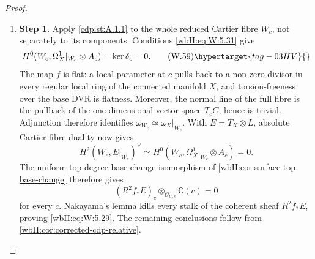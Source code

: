 \begin{proof}
\begin{enumerate}[label={$\langle1\rangle$\arabic*.},leftmargin=*]
\item 
\noindent\textbf{Step 1.} Apply \cref{cdp:st:A.1.1} to the whole reduced
Cartier fibre \(W_c\), not separately to its components.  Conditions \eqref{wbII:eq:W:5.31}
give
\[
 H^0(W_c,\Omega_X^1|_{W_c}\otimes A_c)
 =\ker\delta_c=0.
\tag{W.59}\hypertarget{tag-03HV}{}\label{wbII:eq:W:5.32}
\]
The map \(f\) is flat: a local parameter at \(c\) pulls back to a
non-zero-divisor in every regular local ring of the connected manifold \(X\),
and torsion-freeness over the base DVR is flatness.  Moreover, the normal
line of the full fibre is the pullback of the one-dimensional vector space
\(T_cC\), hence is trivial.  Adjunction therefore identifies
\(\omega_{W_c}\simeq\omega_X|_{W_c}\).  With \(E=T_X\otimes L\), absolute
Cartier-fibre duality now gives
\[
 H^2(W_c,E|_{W_c})^\vee
 \simeq H^0(W_c,\Omega_X^1|_{W_c}\otimes A_c)=0.
\]
The uniform top-degree base-change isomorphism of
\cref{wbII:cor:surface-top-base-change} therefore gives
\[
 (R^2f_*E)_c\otimes_{\mathcal O_{C,c}}\mathbb C(c)=0
\]
for every \(c\).  Nakayama's lemma kills every stalk of the coherent sheaf
\(R^2f_*E\), proving \eqref{wbII:eq:W:5.29}.  The remaining conclusions follow from
\cref{wbII:cor:corrected-cdp-relative}.

\end{enumerate}
\end{proof}
